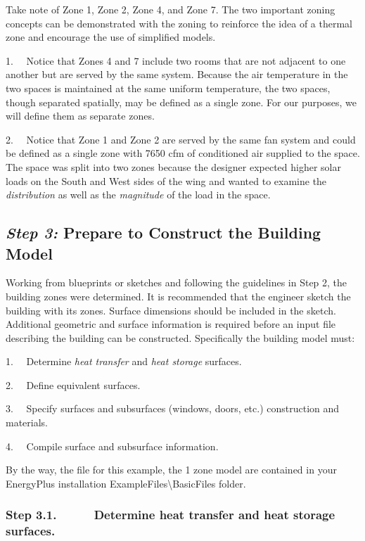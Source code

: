 Take note of Zone 1, Zone 2, Zone 4, and Zone 7. The two important zoning concepts can be demonstrated with the zoning to reinforce the idea of a thermal zone and encourage the use of simplified models.

1.~~ Notice that Zones 4 and 7 include two rooms that are not adjacent to one another but are served by the same system. Because the air temperature in the two spaces is maintained at the same uniform temperature, the two spaces, though separated spatially, may be defined as a single zone. For our purposes, we will define them as separate zones.

2.~~ Notice that Zone 1 and Zone 2 are served by the same fan system and could be defined as a single zone with 7650 cfm of conditioned air supplied to the space. The space was split into two zones because the designer expected higher solar loads on the South and West sides of the wing and wanted to examine the \emph{distribution} as well as the \emph{magnitude} of the load in the space.

\subsection{\emph{Step 3:} Prepare to Construct the Building Model}\label{step-3-prepare-to-construct-the-building-model}

Working from blueprints or sketches and following the guidelines in Step 2, the building zones were determined. It is recommended that the engineer sketch the building with its zones. Surface dimensions should be included in the sketch. Additional geometric and surface information is required before an input file describing the building can be constructed. Specifically the building model must:

1.~~ Determine \emph{heat transfer} and \emph{heat storage} surfaces.

2.~~ Define equivalent surfaces.

3.~~ Specify surfaces and subsurfaces (windows, doors, etc.) construction and materials.

4.~~ Compile surface and subsurface information.

By the way, the file for this example, the 1 zone model are contained in your EnergyPlus installation ExampleFiles\textbackslash{}BasicFiles folder.

\subsubsection{Step 3.1.~~~~~ Determine heat transfer and heat storage surfaces.}\label{step-3.1.-determine-heat-transfer-and-heat-storage-surfaces.}

